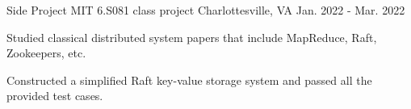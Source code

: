 


\begin{cventries}
  \cventry
    {Side Project}
    {MIT 6.S081 class project}
    {Charlottesville, VA}
    {Jan. 2022 - Mar. 2022}
    {
      \begin{cvitems} %
        \item {Studied classical distributed system papers that include MapReduce, Raft, Zookeepers, etc. }
        \item {Constructed a simplified Raft key-value storage system and passed all the provided test cases. }
      \end{cvitems}
    }
\end{cventries}